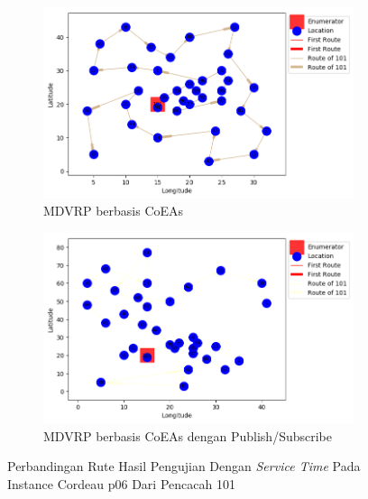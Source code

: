 \begin{figure}[H]
	\centering
	\begin{subfigure}[t]{\textwidth}
		\centering
		\includegraphics[width=\textwidth]{Resources/Images/cordeau_p06_tw/cordeau_p06_tw_101_coes}
		\caption{MDVRP berbasis CoEAs}
		\label{fig:cordeau_p06_tw_101_coes}
	\end{subfigure}
	\begin{subfigure}[t]{\textwidth}
		\centering
		\includegraphics[width=\textwidth]{Resources/Images/cordeau_p06_tw/cordeau_p06_tw_101_pubsub_coes}
		\caption{MDVRP berbasis CoEAs dengan Publish/Subscribe}
		\label{fig:cordeau_p06_tw_101_pubsub_coes}
	\end{subfigure}
	\caption{Perbandingan Rute Hasil Pengujian Dengan \textit{Service Time} Pada Instance Cordeau p06 Dari Pencacah 101}
	\label{fig:cordeau_p06_tw_101}
\end{figure}


